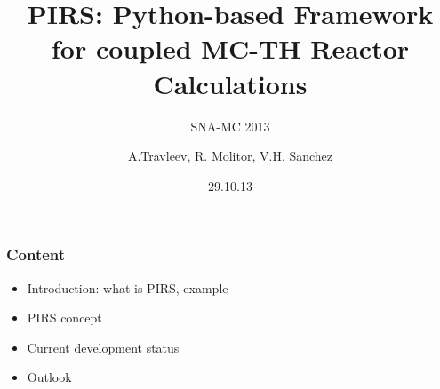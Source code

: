 \documentclass[t]{beamer}
\date{29.10.13}
\title[Python framework for coupled reactor calculations]{PIRS: Python-based Framework for coupled MC-TH Reactor Calculations}
\subtitle{SNA-MC 2013}
\author{A.Travleev, R. Molitor, V.H. Sanchez}
\institute{Institute for Neutron Physics and Reactor Technology}
\begin{document}
\begin{frame}
  \maketitle
\end{frame}

\begin{frame}\frametitle{Content}

    \begin{itemize}
        \item Introduction: what is PIRS, example

        \item PIRS concept

        \item Current development status

        \item Outlook

    \end{itemize}
\end{frame}
\end{document}
